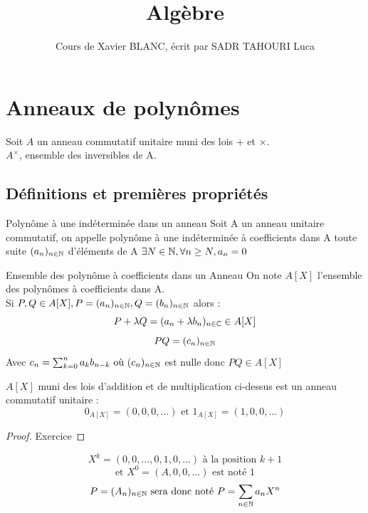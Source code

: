 \documentclass[]{report}
\title{Algèbre}
\author{Cours de Xavier BLANC, écrit par SADR TAHOURI Luca}
\date{}
\begin{document}
    \maketitle
    \tableofcontents

    \chapter{Anneaux de polynômes}

    Soit $A$ un anneau commutatif unitaire muni des lois $+$ et $\times$.\\
    $A^\times$, ensemble des inversibles de A.

    \section{Définitions et premières propriétés}

    \begin{df}{Polynôme à une indéterminée dans un anneau}{}
    Soit A un anneau unitaire commutatif, on appelle polynôme à une indéterminée à coefficients dans A toute suite $(a_n)_{n\in\mathbb{N}}$ d'éléments de A \tq $\exists N\in\mathbb{N},\forall n\ge N, a_n=0$
    \end{df}

    \begin{nt}{Ensemble des polynôme à coefficients dans un Anneau}{}
    On note $A[X]$ l'ensemble des polynômes à coefficients dans A. \\
    Si $P,Q\in A[X], P=(a_n)_{n\in\mathbb{N}},Q=(b_n)_{n\in\mathbb{N}}$ alors :
    \[P+\lambda Q=(a_n+\lambda b_n)_{n\in\mathbb{C}}\in A[X]\]
    \[PQ=(c_n)_{n\in\mathbb{N}}\]
    Avec $c_n=\sum_{k=0}^na_kb_{n-k}\text{ où }(c_n)_{n\in\mathbb{N}}$ est nulle \apcr donc $PQ\in A[X]$
    \end{nt}

    \begin{prop}{}{}
        $A[X]$ muni des lois d'addition et de multiplication ci-dessus est un anneau commutatif unitaire :
        \[0_{A[X]}=(0,0,0,\dots)\text{ et }1_{A[X]}=(1,0,0,\dots)\]
    \end{prop}

    \begin{proof}
        Exercice
    \end{proof}

    \begin{nt}{}{}
        \[X^k=(0,0,\dots,0,1,0,\dots) \text{ à la position $k+1$}\]
        \[\text{et } X^0=(A,0,0,\dots) \text{ est noté 1}\]
        \[P=(A_n)_{n\in\mathbb{N}}\text{ sera donc noté }P=\sum_{n\in\mathbb{N}}a_nX^n\]
    \end{nt}
\end{document}
